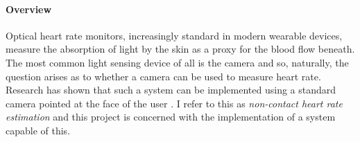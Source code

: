 \paragraph{Overview}
Optical heart rate monitors, increasingly standard in modern wearable devices, measure the absorption of light
by the skin as a proxy for the blood flow beneath.
The most common light sensing device of all is the camera and so, naturally, the question arises as to whether a camera can be used to measure heart rate.
Research has shown that such a system can be implemented using a standard camera pointed at the face of the user \cite{poh2010non}\cite{vanderKooij2019}\cite{Verkruysse2008}. I refer to this as \textit{non-contact heart rate estimation} and this project is concerned with the implementation of a system capable of this.  

